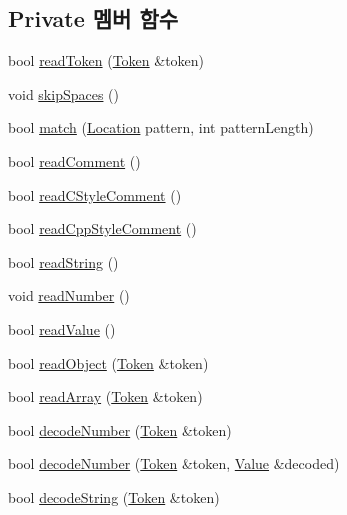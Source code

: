 \subsection*{Private 멤버 함수}
\begin{DoxyCompactItemize}
\item 
bool \hyperlink{class_json_1_1_reader_a7cb0631963cc0fd4ff6ed0f570976864}{read\+Token} (\hyperlink{class_json_1_1_reader_1_1_token}{Token} \&token)
\item 
void \hyperlink{class_json_1_1_reader_a40d0f69d15aeb2d52ff78d794f5ab8b2}{skip\+Spaces} ()
\item 
bool \hyperlink{class_json_1_1_reader_a3e5a7bc6b7b53f2ca8cb9da42f8ffb21}{match} (\hyperlink{class_json_1_1_reader_a46795b5b272bf79a7730e406cb96375a}{Location} pattern, int pattern\+Length)
\item 
bool \hyperlink{class_json_1_1_reader_ad2690e860a1b3332c5401fb0850ba065}{read\+Comment} ()
\item 
bool \hyperlink{class_json_1_1_reader_ae0ffe796abdc3c5851589ee500e28c79}{read\+C\+Style\+Comment} ()
\item 
bool \hyperlink{class_json_1_1_reader_a6716ef6290b0f469efaf8d379c357967}{read\+Cpp\+Style\+Comment} ()
\item 
bool \hyperlink{class_json_1_1_reader_a6328a0b1994e05118886f9fc9c608643}{read\+String} ()
\item 
void \hyperlink{class_json_1_1_reader_afb31bfda6bb27d6453057a47655e8363}{read\+Number} ()
\item 
bool \hyperlink{class_json_1_1_reader_a47e56844b803d41ec993a83fadf4495c}{read\+Value} ()
\item 
bool \hyperlink{class_json_1_1_reader_a0068eb3d8e86e91f0e4806f60da66b9c}{read\+Object} (\hyperlink{class_json_1_1_reader_1_1_token}{Token} \&token)
\item 
bool \hyperlink{class_json_1_1_reader_afd9a30c0af205c9f327613f486fae6b8}{read\+Array} (\hyperlink{class_json_1_1_reader_1_1_token}{Token} \&token)
\item 
bool \hyperlink{class_json_1_1_reader_a442d1f23edf0f4350f5eeab3ee3f7d46}{decode\+Number} (\hyperlink{class_json_1_1_reader_1_1_token}{Token} \&token)
\item 
bool \hyperlink{class_json_1_1_reader_a72f426ce3fa384d14aa10e9dd75618f0}{decode\+Number} (\hyperlink{class_json_1_1_reader_1_1_token}{Token} \&token, \hyperlink{class_json_1_1_value}{Value} \&decoded)
\item 
bool \hyperlink{class_json_1_1_reader_aaf736937912f5c9b8d221e57f209e3e0}{decode\+String} (\hyperlink{class_json_1_1_reader_1_1_token}{Token} \&token)

\end{DoxyCompactItemize}
